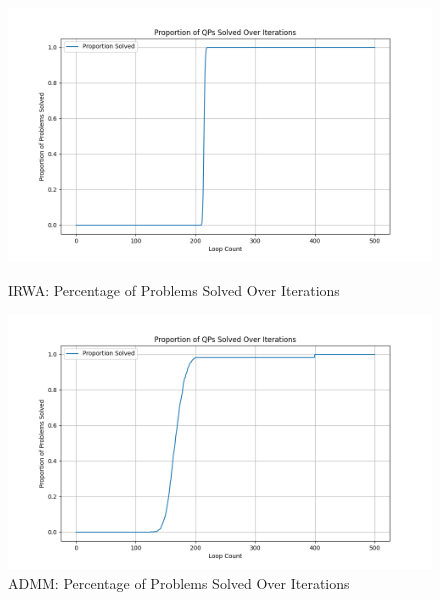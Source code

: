 \documentclass{article}
\begin{document}
\begin{figure}[htbp]
    \centering
    \begin{minipage}{0.49\linewidth}
        \includegraphics[width=\linewidth]{fig/IRWAQP_percentage_solved_LARGE.png}
        \caption{IRWA: Percentage of Problems Solved Over Iterations}
        \label{fig:IRWAQP_percentage_solved_LARGE}
    \end{minipage}
    \begin{minipage}{0.49\linewidth}
        \includegraphics[width=\linewidth]{fig/ADMMQP_percentage_solved.png}
        \caption{ADMM: Percentage of Problems Solved Over Iterations}
        \label{fig:ADMMQP_percentage_solved_LARGE}
    \end{minipage}
\end{figure}

    
\end{document}

